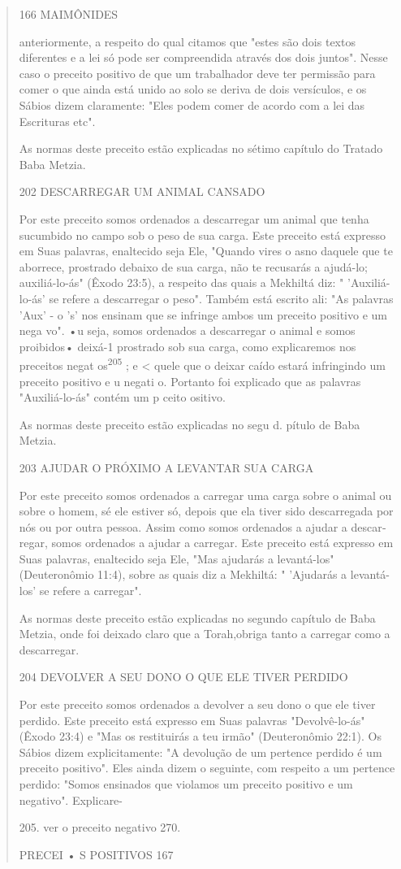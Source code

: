 \begin{quote}
166 MAIMÔNIDES

anteriormente, a respeito do qual citamos que "estes são dois textos
diferentes e a lei só pode ser compreendida através dos dois juntos".
Nesse caso o precei­to positivo de que um trabalhador deve ter permissão
para comer o que ainda está unido ao solo se deriva de dois versículos,
e os Sábios dizem claramente: "Eles podem comer de acordo com a lei das
Escrituras etc".

As normas deste preceito estão explicadas no sétimo capítulo do Tra­tado
Baba Metzia.

202 DESCARREGAR UM ANIMAL CANSADO

Por este preceito somos ordenados a descarregar um animal que te­nha
sucumbido no campo sob o peso de sua carga. Este preceito está expresso
em Suas palavras, enaltecido seja Ele, "Quando vires o asno daquele que
te abor­rece, prostrado debaixo de sua carga, não te recusarás a
ajudá-lo; auxiliá-lo-ás" (Êxodo 23:5), a respeito das quais a Mekhiltá
diz: " 'Auxiliá-lo-ás' se refere a descarregar o peso". Também está
escrito ali: "As palavras 'Aux' - o 's' nos ensinam que se infringe
ambos um preceito positivo e um nega vo". •u seja, somos ordenados a
descarregar o animal e somos proibidos• deixá-1 pros­trado sob sua
carga, como explicaremos nos preceitos negat os\textsuperscript{205} ; e
\textless{} quele que o deixar caído estará infringindo um preceito
positivo e u negati o. Por­tanto foi explicado que as palavras
"Auxiliá-lo-ás" contém um p ceito ositivo.

As normas deste preceito estão explicadas no segu d. pítulo de Baba
Metzia.

203 AJUDAR O PRÓXIMO A LEVANTAR SUA CARGA

Por este preceito somos ordenados a carregar uma carga sobre o ani­mal
ou sobre o homem, sé ele estiver só, depois que ela tiver sido
descarregada por nós ou por outra pessoa. Assim como somos ordenados a
ajudar a descar­regar, somos ordenados a ajudar a carregar. Este
preceito está expresso em Suas palavras, enaltecido seja Ele, "Mas
ajudarás a levantá-los" (Deuteronômio 11:4), sobre as quais diz a
Mekhiltá: " 'Ajudarás a levantá-los' se refere a carregar".

As normas deste preceito estão explicadas no segundo capítulo de Baba
Metzia, onde foi deixado claro que a Torah,obriga tanto a carregar como
a descarregar.

204 DEVOLVER A SEU DONO O QUE ELE TIVER PERDIDO

Por este preceito somos ordenados a devolver a seu dono o que ele tiver
perdido. Este preceito está expresso em Suas palavras "Devolvê-lo-ás"
(Êxo­do 23:4) e "Mas os restituirás a teu irmão" (Deuteronômio 22:1). Os
Sábios di­zem explicitamente: "A devolução de um pertence perdido é um
preceito po­sitivo". Eles ainda dizem o seguinte, com respeito a um
pertence perdido: "So­mos ensinados que violamos um preceito positivo e
um negativo". Explicare-

205. ver o preceito negativo 270.

PRECEI • S POSITIVOS 167
\end{quote}

